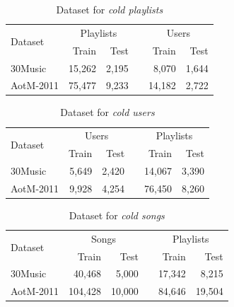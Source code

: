 \begin{table}[!h]
    \centering
    \caption{Dataset for \emph{cold playlists}}
    \label{tab:stats3}
    \begin{tabular}{lrrcrr}
        \toprule
        \multirow{2}{*}{Dataset}  & \multicolumn{2}{c}{Playlists} && \multicolumn{2}{c}{Users} \\ \cmidrule{2-3} \cmidrule{5-6}
                                  & Train & Test && Train & Test \\
        \midrule
        30Music   & 15,262 & 2,195 &&  8,070 & 1,644 \\
        AotM-2011 & 75,477 & 9,233 && 14,182 & 2,722 \\
        \bottomrule
    \end{tabular}
\end{table}

\begin{table}[!h]
    \centering
    \caption{Dataset for \emph{cold users}}
    \label{tab:stats4}
    \begin{tabular}{lrrcrr}
        \toprule
        \multirow{2}{*}{Dataset}  & \multicolumn{2}{c}{Users} && \multicolumn{2}{c}{Playlists} \\ \cmidrule{2-3} \cmidrule{5-6}
                                  & Train & Test && Train & Test \\
        \midrule
        30Music   & 5,649 & 2,420 && 14,067 & 3,390 \\
        AotM-2011 & 9,928 & 4,254 && 76,450 & 8,260 \\
        \bottomrule
    \end{tabular}
\end{table}

\begin{table}[!h]
    \centering
    \caption{Dataset for \emph{cold songs}}
    \label{tab:stats1}
    \begin{tabular}{lrrcrr}
        \toprule
        \multirow{2}{*}{Dataset}  & \multicolumn{2}{c}{Songs} && \multicolumn{2}{c}{Playlists} \\ \cmidrule{2-3} \cmidrule{5-6}
                                  & Train & Test && Train & Test \\
        \midrule
        30Music   & 40,468  & 5,000  && 17,342  & 8,215 \\
        AotM-2011 & 104,428 & 10,000 && 84,646  & 19,504 \\
        \bottomrule
    \end{tabular}
\end{table}



